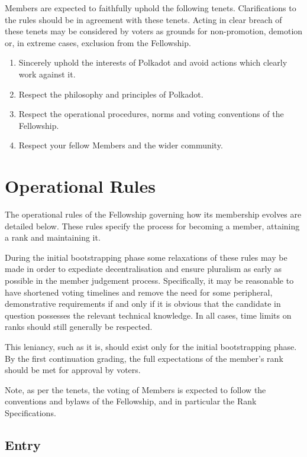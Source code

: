 \documentclass[9pt,oneside]{amsart}
\begin{document}
Members are expected to faithfully uphold the following tenets. Clarifications to the rules should be in agreement with these tenets. Acting in clear breach of these tenets may be considered by voters as grounds for non-promotion, demotion or, in extreme cases, exclusion from the Fellowship.

\begin{enumerate}
\item Sincerely uphold the interests of Polkadot and avoid actions which clearly work against it.
\item Respect the philosophy and principles of Polkadot.
\item Respect the operational procedures, norms and voting conventions of the Fellowship.
\item Respect your fellow Members and the wider community.
\end{enumerate}

\section{Operational Rules}\label{operational-rules}

The operational rules of the Fellowship governing how its membership evolves are detailed below. These rules specify the process for becoming a member, attaining a rank and maintaining it.

During the initial bootstrapping phase some relaxations of these rules may be made in order to expediate decentralisation and ensure pluralism as early as possible in the member judgement process. Specifically, it may be reasonable to have shortened voting timelines and remove the need for some peripheral, demonstrative requirements if and only if it is obvious that the candidate in question possesses the relevant technical knowledge. In all cases, time limits on ranks should still generally be respected.

This leniancy, such as it is, should exist only for the initial bootstrapping phase. By the first  continuation grading, the full expectations of the member's rank should be met for approval by voters.

Note, as per the tenets, the voting of Members is expected to follow the conventions and bylaws of the Fellowship, and in particular the Rank Specifications.

\subsection{Entry}
\end{document}
